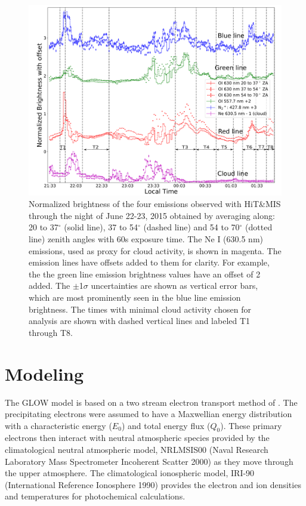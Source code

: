 \documentclass[crop=false,class=mitthesis,oneside,font=12pt]{standalone}
\begin{document}
\begin{figure}[H]
	\centering\includegraphics[width=35pc]{nbgr.pdf}
	\caption{Normalized brightness of the four emissions observed with HiT\&MIS through the night of June 22-23, 2015 obtained by averaging along: 20 to 37$^\circ$ (solid line), 37 to 54$^\circ$ (dashed line) and 54 to 70$^\circ$ (dotted line) zenith angles with 60s exposure time. The Ne I (630.5 nm) emissions, used as proxy for cloud activity, is shown in magenta.  
		The emission lines have offsets added to them for clarity. For example, the the green line emission brightness values have an offset of 2 added. The $\pm$1$\sigma$ uncertainties are shown as vertical error bars, which are most prominently seen in the blue line emission brightness.
		The times with minimal cloud activity chosen for analysis are shown with dashed vertical lines and labeled T1 through T8.}
	\label{feature:nbrg}
\end{figure}

\section{Modeling} 
\label{sec:model}
The GLOW model is based on a two stream electron transport method of \citet{nagybanks1970}. The precipitating electrons were assumed to have a Maxwellian energy distribution with a characteristic energy ($E_{0}$) and total energy flux ($Q_{0}$). These primary electrons then interact with neutral atmospheric species provided by the climatological neutral atmospheric model, NRLMSIS00 (Naval Research Laboratory Mass Spectrometer Incoherent Scatter 2000) \citep{msie} as they move through the upper atmosphere. The climatological ionospheric model, IRI-90 (International Reference Ionosphere 1990) \citep{iri} provides the electron and ion densities and temperatures for photochemical calculations.
\end{document}
